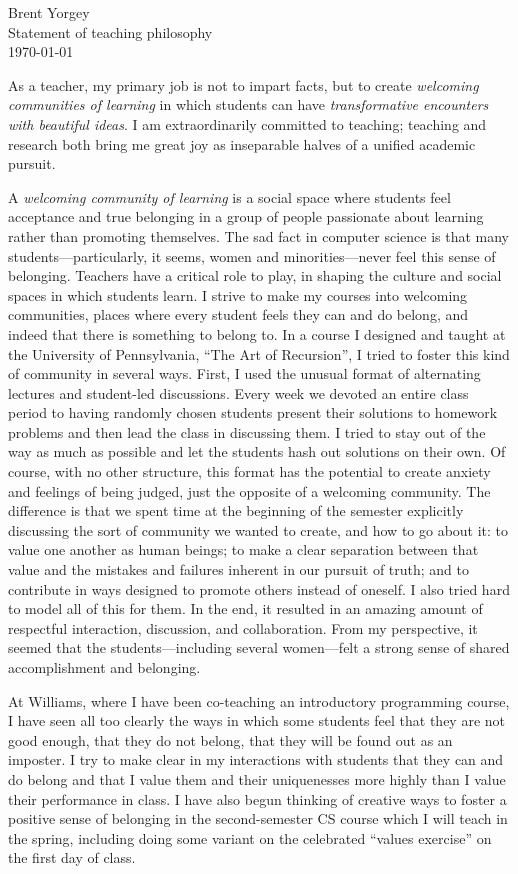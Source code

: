\documentclass[12pt]{article}
\begin{document}
\noindent Brent Yorgey \\
Statement of teaching philosophy \\
\today
\bigskip

As a teacher, my primary job is not to impart facts, but to create
\emph{welcoming communities of learning} in which students can have
\emph{transformative encounters with beautiful ideas}.  I am
extraordinarily committed to teaching; teaching and research both
bring me great joy as inseparable halves of a unified academic
pursuit.

A \emph{welcoming community of learning} is a social space where
students feel acceptance and true belonging in a group of people
passionate about learning rather than promoting themselves.  The sad
fact in computer science is that many students---particularly, it
seems, women and minorities---never feel this sense of
belonging. Teachers have a critical role to play, in shaping the
culture and social spaces in which students learn.  I strive to make
my courses into welcoming communities, places where every student
feels they can and do belong, and indeed that there is something to
belong to.  In a course I designed and taught at the University of
Pennsylvania, ``The Art of Recursion'', I tried to foster this kind of
community in several ways.  First, I used the unusual format of
alternating lectures and student-led discussions. Every week we
devoted an entire class period to having randomly chosen students
present their solutions to homework problems and then lead the class
in discussing them.  I tried to stay out of the way as much as
possible and let the students hash out solutions on their own.  Of
course, with no other structure, this format has the potential to
create anxiety and feelings of being judged, just the opposite of a
welcoming community.  The difference is that we spent time at the
beginning of the semester explicitly discussing the sort of community
we wanted to create, and how to go about it: to value one another as
human beings; to make a clear separation between that value and the
mistakes and failures inherent in our pursuit of truth; and to
contribute in ways designed to promote others instead of oneself. I
also tried hard to model all of this for them. In the end, it resulted
in an amazing amount of respectful interaction, discussion, and
collaboration. From my perspective, it seemed that the
students---including several women---felt a strong sense of shared
accomplishment and belonging.

At Williams, where I have been co-teaching an introductory programming
course, I have seen all too clearly the ways in which some students
feel that they are not good enough, that they do not belong, that they
will be found out as an imposter.  I try to make clear in my
interactions with students that they can and do belong and that I
value them and their uniquenesses more highly than I value their
performance in class.  I have also begun thinking of creative ways to
foster a positive sense of belonging in the second-semester CS course
which I will teach in the spring, including doing some variant on the
celebrated “values exercise” \citep{miyake2010reducing} on the first
day of class.
\end{document}

